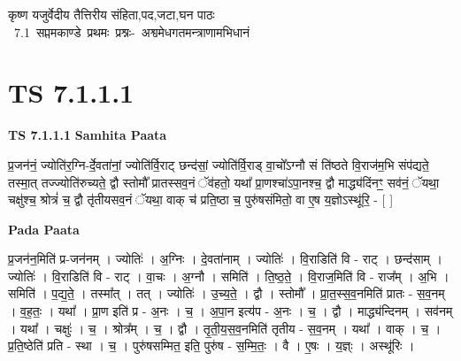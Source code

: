 \documentclass[17pt]{extarticle}
\begin{document}
\begin{titlepage}
    \begin{center}
 
\begin{sanskrit}
    { \Huge
    कृष्ण यजुर्वेदीय तैत्तिरीय संहिता,पद,जटा,घन पाठः 
    }
    \\
    \vspace{2.5cm}
    \mbox{ \Huge
    7.1      सप्तमकाण्डे प्रथमः प्रश्नः- अश्वमेधगतमन्त्राणामभिधानं   }
\end{sanskrit}
\end{center}

\end{titlepage}
\tableofcontents
\pagebreak

\section*{ TS 7.1.1.1 }

\textbf{TS 7.1.1.1 } \newline
\textbf{Samhita Paata} \newline

प्र॒जन॑नं॒ ज्योति॑र॒ग्नि-र्दे॒वता॑नां॒ ज्योति॑र्वि॒राट् छन्द॑सां॒ ज्योति॑र्वि॒राड् वा॒चो᳚ऽग्नौ सं ति॑ष्ठते वि॒राज॑म॒भि संप॑द्यते॒ तस्मा॒त् तज्ज्योति॑रुच्यते॒ द्वौ स्तोमौ᳚ प्रातस्सव॒नं ॅव॑हतो॒ यथा᳚ प्रा॒णश्चा॑ऽपा॒नश्च॒ द्वौ माद्ध्य॑दिंनꣳ॒॒ सव॑नं॒ ॅयथा॒ चक्षु॑श्च॒ श्रोत्रं॑ च॒ द्वौ तृ॑तीयसव॒नं ॅयथा॒ वाक् च॑ प्रति॒ष्ठा च॒ पुरु॑षसंमितो॒ वा ए॒ष य॒ज्ञोऽस्थू॑रि॒ - [  ] \newline

\textbf{Pada Paata} \newline

प्र॒जन॑न॒मिति॑ प्र-जन॑नम् । ज्योतिः॑ । अ॒ग्निः । दे॒वता॑नाम् । ज्योतिः॑ । वि॒राडिति॑ वि - राट् । छन्द॑साम् । ज्योतिः॑ । वि॒राडिति॑ वि - राट् । वा॒चः । अ॒ग्नौ । समिति॑ । ति॒ष्ठ॒ते॒ । वि॒राज॒मिति॑ वि - राज᳚म् । अ॒भि । समिति॑ । प॒द्य॒ते॒ । तस्मा᳚त् । तत् । ज्योतिः॑ । उ॒च्य॒ते॒ । द्वौ । स्तोमौ᳚ । प्रा॒त॒स्स॒व॒नमिति॑ प्रातः - स॒व॒नम् । व॒ह॒तः॒ । यथा᳚ । प्रा॒ण इति॑ प्र - अ॒नः । च॒ । अ॒पा॒न इत्य॑प - अ॒नः । च॒ । द्वौ । माद्ध्य॑न्दिनम् । सव॑नम् । यथा᳚ । चक्षुः॑ । च॒ । श्रोत्र᳚म् । च॒ । द्वौ । तृ॒ती॒य॒स॒व॒नमिति॑ तृतीय - स॒व॒नम् । यथा᳚ । वाक् । च॒ । प्र॒ति॒ष्ठेति॑ प्रति - स्था । च॒ । पुरु॑षसम्मित॒ इति॒ पुरु॑ष - स॒म्मि॒तः॒ । वै । ए॒षः । य॒ज्ञ्ः । अस्थू॑रिः ।  \newline
\end{document}
